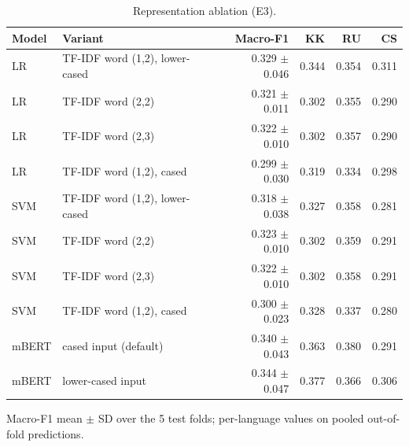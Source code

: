 \begin{table}[htbp]
\centering
\caption{Representation ablation (E3).}
\label{tab:ablation}
\begin{tabular}{llrrrr}
\toprule
Model & Variant & Macro-F1 & KK & RU & CS \\
\midrule
LR & TF-IDF word (1,2), lower-cased & 0.329 $\pm$ 0.046 & 0.344 & 0.354 & 0.311 \\
LR & TF-IDF word (2,2) & 0.321 $\pm$ 0.011 & 0.302 & 0.355 & 0.290 \\
LR & TF-IDF word (2,3) & 0.322 $\pm$ 0.010 & 0.302 & 0.357 & 0.290 \\
LR & TF-IDF word (1,2), cased & 0.299 $\pm$ 0.030 & 0.319 & 0.334 & 0.298 \\
\midrule
SVM & TF-IDF word (1,2), lower-cased & 0.318 $\pm$ 0.038 & 0.327 & 0.358 & 0.281 \\
SVM & TF-IDF word (2,2) & 0.323 $\pm$ 0.010 & 0.302 & 0.359 & 0.291 \\
SVM & TF-IDF word (2,3) & 0.322 $\pm$ 0.010 & 0.302 & 0.358 & 0.291 \\
SVM & TF-IDF word (1,2), cased & 0.300 $\pm$ 0.023 & 0.328 & 0.337 & 0.280 \\
\midrule
mBERT & cased input (default) & 0.340 $\pm$ 0.043 & 0.363 & 0.380 & 0.291 \\
mBERT & lower-cased input & 0.344 $\pm$ 0.047 & 0.377 & 0.366 & 0.306 \\
\bottomrule
\end{tabular}
\par\smallskip\footnotesize Macro-F1 mean $\pm$ SD over the 5 test folds; per-language values on pooled out-of-fold predictions.
\end{table}
